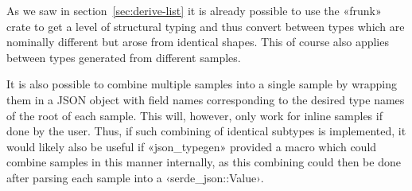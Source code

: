As we saw in section~\ref{sec:derive-list} it is already possible to use the «frunk» crate to get a level of structural typing and thus convert between types which are nominally different but arose from identical shapes. This of course also applies between types generated from different samples.

It is also possible to combine multiple samples into a single sample by wrapping them in a JSON object with field names corresponding to the desired type names of the root of each sample. This will, however, only work for inline samples if done by the user. Thus, if such combining of identical subtypes is implemented, it would likely also be useful if «json_typegen» provided a macro which could combine samples in this manner internally, as this combining could then be done after parsing each sample into a ‹serde_json::Value›.
